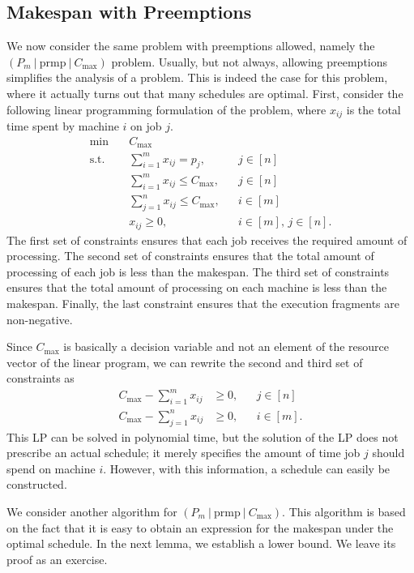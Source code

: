 \subsection{Makespan with Preemptions} \label{subsec:6.4}
We now consider the same problem with preemptions allowed, namely the 
$(P_m~|~\text{prmp}~|~C_{\max})$ problem. Usually, but not always, allowing 
preemptions simplifies the analysis of a problem. This is indeed the case for 
this problem, where it actually turns out that many schedules are optimal. 
First, consider the following linear programming formulation of the problem, 
where $x_{ij}$ is the total time spent by machine $i$ on job $j$. 
\begin{align*}
    \min\quad & C_{\max} \\ 
    \text{s.t.}\quad & \sum_{i=1}^m x_{ij} = p_j, && j \in [n] \\ 
    & \sum_{i=1}^m x_{ij} \leq C_{\max}, && j \in [n] \\
    & \sum_{j=1}^n x_{ij} \leq C_{\max}, && i \in [m] \\
    & x_{ij} \geq 0, && i \in [m],\,j \in [n]. 
\end{align*}
The first set of constraints ensures that each job receives the required 
amount of processing. The second set of constraints ensures that the total 
amount of processing of each job is less than the makespan. The third 
set of constraints ensures that the total amount of processing on each 
machine is less than the makespan. Finally, the last constraint ensures that 
the execution fragments are non-negative. 

Since $C_{\max}$ is basically a decision variable and not an element of 
the resource vector of the linear program, we can rewrite the second and third 
set of constraints as 
\begin{align*}
    C_{\max} - \sum_{i=1}^m x_{ij} &\geq 0, && j \in [n] \\ 
    C_{\max} - \sum_{j=1}^n x_{ij} &\geq 0, && i \in [m]. 
\end{align*}
This LP can be solved in polynomial time, but the solution of the LP does
not prescribe an actual schedule; it merely specifies the amount of time job
$j$ should spend on machine $i$. However, with this information, a schedule can
easily be constructed.

We consider another algorithm for $(P_m~|~\text{prmp}~|~C_{\max})$. This 
algorithm is based on the fact that it is easy to obtain an expression for the
makespan under the optimal schedule. In the next lemma, we establish a lower 
bound. We leave its proof as an exercise. 

